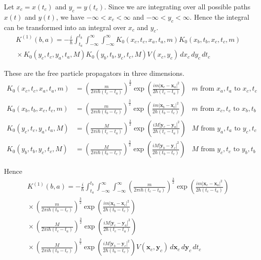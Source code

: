 Let $x_c=x(t_c)$ and $y_c=y(t_c)$.
Since we are integrating over all possible paths $x(t)$ and $y(t)$,
we have $-\infty<x_c<\infty$ and $-\infty<y_c<\infty$.
Hence the integral can be transformed into an integral over $x_c$ and $y_c$.
\begin{multline*}
K^{(1)}(b,a)=-\frac{i}{\hbar}\int_{t_a}^{t_b}\int_{-\infty}^\infty\int_{-\infty}^\infty
K_0(x_c,t_c,x_a,t_a,m)
K_0(x_b,t_b,x_c,t_c,m)
\\
{}\times
K_0(y_c,t_c,y_a,t_a,M)
K_0(y_b,t_b,y_c,t_c,M)
V(x_c,y_c)
\,dx_c\,dy_c\,dt_c
\end{multline*}

These are the free particle propagators in three dimensions.
\begin{align*}
K_0(x_c,t_c,x_a,t_a,m)&=\left(\frac{m}{2\pi i\hbar(t_c-t_a)}\right)^\frac{3}{2}
\exp\left(\frac{im|\mathbf x_c-\mathbf x_a|^2}{2\hbar(t_c-t_a)}\right)
&\text{$m$ from $x_a,t_a$ to $x_c,t_c$}
\\
K_0(x_b,t_b,x_c,t_c,m)&=\left(\frac{m}{2\pi i\hbar(t_b-t_c)}\right)^\frac{3}{2}
\exp\left(\frac{im|\mathbf x_b-\mathbf x_c|^2}{2\hbar(t_b-t_c)}\right)
&\text{$m$ from $x_c,t_c$ to $x_b,t_b$}
\\
K_0(y_c,t_c,y_a,t_a,M)&=\left(\frac{M}{2\pi i\hbar(t_c-t_a)}\right)^\frac{3}{2}
\exp\left(\frac{iM|\mathbf y_c-\mathbf y_a|^2}{2\hbar(t_c-t_a)}\right)
&\text{$M$ from $y_a,t_a$ to $y_c,t_c$}
\\
K_0(y_b,t_b,y_c,t_c,M)&=\left(\frac{M}{2\pi i\hbar(t_b-t_c)}\right)^\frac{3}{2}
\exp\left(\frac{iM|\mathbf y_b-\mathbf y_c|^2}{2\hbar(t_b-t_c)}\right)
&\text{$M$ from $y_c,t_c$ to $y_b,t_b$}
\end{align*}

Hence
\begin{multline*}
K^{(1)}(b,a)=-\frac{i}{\hbar}\int_{t_a}^{t_b}\int_{-\infty}^\infty\int_{-\infty}^\infty
\left(\frac{m}{2\pi i\hbar(t_c-t_a)}\right)^\frac{3}{2}
\exp\left(\frac{im|\mathbf x_c-\mathbf x_a|^2}{2\hbar(t_c-t_a)}\right)
\\
{}\times
\left(\frac{m}{2\pi i\hbar(t_b-t_c)}\right)^\frac{3}{2}
\exp\left(\frac{im|\mathbf x_b-\mathbf x_c|^2}{2\hbar(t_b-t_c)}\right)
\\
{}\times
\left(\frac{M}{2\pi i\hbar(t_c-t_a)}\right)^\frac{3}{2}
\exp\left(\frac{iM|\mathbf y_c-\mathbf y_a|^2}{2\hbar(t_c-t_a)}\right)
\\
{}\times
\left(\frac{M}{2\pi i\hbar(t_b-t_c)}\right)^\frac{3}{2}
\exp\left(\frac{iM|\mathbf y_b-\mathbf y_c|^2}{2\hbar(t_b-t_c)}\right)
V(\mathbf x_c,\mathbf y_c)
\,d\mathbf x_c\,d\mathbf y_c\,dt_c
\end{multline*}

